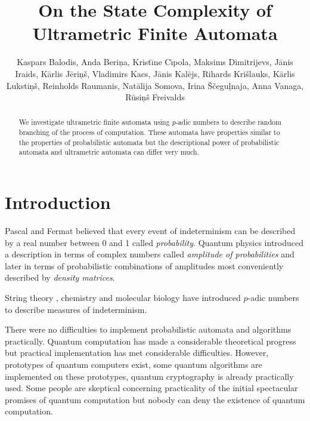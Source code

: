 \documentclass{llncs}
\begin{document}
\title{On the State Complexity of Ultrametric Finite Automata}


\author{
Kaspars Balodis,
Anda Beri\c na,
Krist\= \i ne C\= \i pola,
Maksims Dimitrijevs,
J\= anis Iraids,
K\= arlis J\= eri\c n\v s,
Vladimirs Kacs,
J\= anis Kal\= ejs,
Rihards Kri\v slauks,
K\= arlis Luksti\c n\v s,
Reinholds Raumanis,
Nat\= alija Somova,
Irina \v S\v cegu\c lnaja,
Anna Vanaga,
R\= usi\c n\v s Freivalds}



\maketitle

\begin{abstract}  
We investigate ultrametric finite automata using $p$-adic numbers to describe random branching of the process of computation. These automata have properties similar to the properties of probabilistic automata but the descriptional power of probabilistic automata and ultrametric automata can differ very much.
\end{abstract} 



\section{Introduction} 

Pascal and Fermat believed that every event of indeterminism can be described by a real number between 0 and 1 called 
{\em probability}. Quantum physics introduced a description in terms of complex numbers called {\em amplitude of 
probabilities} and later in terms of probabilistic combinations of amplitudes most conveniently described by {\em density
matrices}.

String theory \cite{VVZ95}, chemistry \cite{K06} and molecular biology \cite{DD09,Kh97} have introduced $p$-adic numbers to describe
measures of indeterminism. 

There were no difficulties to implement probabilistic automata and algorithms practically. Quantum computation \cite{H01}  has made a considerable
theoretical progress but practical implementation has met considerable difficulties. However, prototypes of quantum computers exist, some
quantum algorithms are implemented on these prototypes, quantum cryptography is already practically used. Some people are skeptical concerning
practicality of the initial spectacular promises of quantum computation but nobody can deny the existence of quantum computation.
\end{document}
